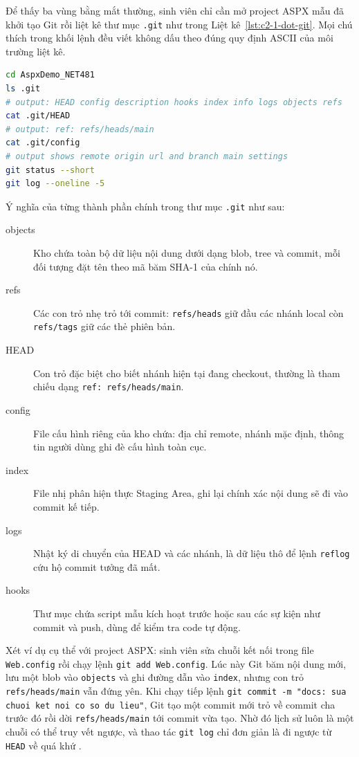 Để thấy ba vùng bằng mắt thường, sinh viên chỉ cần mở project ASPX mẫu đã khởi tạo Git rồi liệt kê thư mục \texttt{.git} như trong Liệt kê~\ref{lst:c2-1-dot-git}. Mọi chú thích trong khối lệnh đều viết không dấu theo đúng quy định ASCII của môi trường liệt kê.

\begin{lstlisting}[language=bash, caption={Khám phá thư mục .git trong project ASPX mẫu}, label={lst:c2-1-dot-git}]
cd AspxDemo_NET481
ls .git
# output: HEAD config description hooks index info logs objects refs
cat .git/HEAD
# output: ref: refs/heads/main
cat .git/config
# output shows remote origin url and branch main settings
git status --short
git log --oneline -5
\end{lstlisting}

Ý nghĩa của từng thành phần chính trong thư mục \texttt{.git} như sau:

\begin{description}
\item[objects] Kho chứa toàn bộ dữ liệu nội dung dưới dạng blob, tree và commit, mỗi đối tượng đặt tên theo mã băm SHA-1 của chính nó.
\item[refs] Các con trỏ nhẹ trỏ tới commit: \texttt{refs/heads} giữ đầu các nhánh local còn \texttt{refs/tags} giữ các thẻ phiên bản.
\item[HEAD] Con trỏ đặc biệt cho biết nhánh hiện tại đang checkout, thường là tham chiếu dạng \texttt{ref: refs/heads/main}.
\item[config] File cấu hình riêng của kho chứa: địa chỉ remote, nhánh mặc định, thông tin người dùng ghi đè cấu hình toàn cục.
\item[index] File nhị phân hiện thực Staging Area, ghi lại chính xác nội dung sẽ đi vào commit kế tiếp.
\item[logs] Nhật ký di chuyển của HEAD và các nhánh, là dữ liệu thô để lệnh \texttt{reflog} cứu hộ commit tưởng đã mất.
\item[hooks] Thư mục chứa script mẫu kích hoạt trước hoặc sau các sự kiện như commit và push, dùng để kiểm tra code tự động.
\end{description}

Xét ví dụ cụ thể với project ASPX: sinh viên sửa chuỗi kết nối trong file \texttt{Web.config} rồi chạy lệnh \verb|git add Web.config|. Lúc này Git băm nội dung mới, lưu một blob vào \texttt{objects} và ghi đường dẫn vào \texttt{index}, nhưng con trỏ \texttt{refs/heads/main} vẫn đứng yên. Khi chạy tiếp lệnh \verb|git commit -m "docs: sua chuoi ket noi co so du lieu"|, Git tạo một commit mới trỏ về commit cha trước đó rồi dời \texttt{refs/heads/main} tới commit vừa tạo. Nhờ đó lịch sử luôn là một chuỗi có thể truy vết ngược, và thao tác \verb|git log| chỉ đơn giản là đi ngược từ \texttt{HEAD} về quá khứ \cite{progit}.

